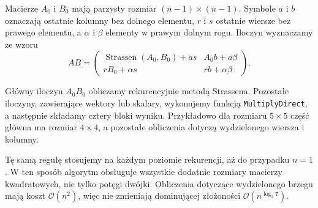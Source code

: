 \documentclass{article}
\begin{document}
Macierze $A_0$ i $B_0$ mają parzysty rozmiar $(n-1)\times(n-1)$. Symbole $a$ i $b$ oznaczają ostatnie kolumny bez dolnego elementu, $r$ i $s$ ostatnie wiersze bez prawego elementu, a $\alpha$ i $\beta$ elementy w prawym dolnym rogu. Iloczyn wyznaczamy ze wzoru
\[
AB=\begin{pmatrix}
\operatorname{Strassen}(A_0,B_0)+as & A_0b+a\beta \\
rB_0+\alpha s & rb+\alpha\beta
\end{pmatrix}.
\]

Główny iloczyn $A_0B_0$ obliczamy rekurencyjnie metodą Strassena. Pozostałe iloczyny, zawierające wektory lub skalary, wykonujemy funkcją \texttt{MultiplyDirect}, a następnie składamy cztery bloki wyniku. Przykładowo dla rozmiaru $5\times5$ część główna ma rozmiar $4\times4$, a pozostałe obliczenia dotyczą wydzielonego wiersza i kolumny.

Tę samą regułę stosujemy na każdym poziomie rekurencji, aż do przypadku $n=1$. W ten sposób algorytm obsługuje wszystkie dodatnie rozmiary macierzy kwadratowych, nie tylko potęgi dwójki. Obliczenia dotyczące wydzielonego brzegu mają koszt $\mathcal{O}(n^2)$, więc nie zmieniają dominującej złożoności $\mathcal{O}(n^{\log_2 7})$.
\end{document}

